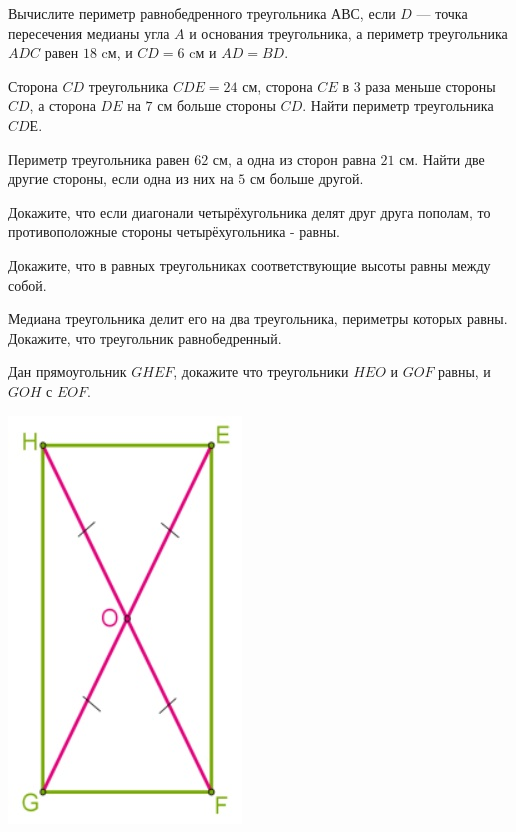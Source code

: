 \begin{class}[number=6]
	\begin{listofex}
		\item Вычислите периметр равнобедренного треугольника \(АВС\), если \(D\) --- точка пересечения медианы угла \(A\) и основания треугольника, а периметр треугольника \(ADC\) равен \(18\) cм, и \(CD = 6\) cм и \(AD = BD\).
		\item Сторона \(CD\) треугольника \(CDE = 24\) см, сторона \(CE\) в \(3\) раза меньше стороны  \(CD\), а сторона \(DE\) на \(7\) см больше стороны \(CD\). Найти периметр треугольника  \(CDЕ\).
		\item Периметр треугольника равен \(62\) см, а одна из сторон равна \(21\) см. Найти две другие стороны, если одна из них на \(5\) см больше другой.
		\item Докажите, что если диагонали четырёхугольника делят друг друга пополам, то противоположные стороны четырёхугольника - равны.
		\item Докажите, что в равных треугольниках соответствующие высоты равны между собой.
		\item Медиана треугольника делит его на два треугольника, периметры которых равны. Докажите, что треугольник равнобедренный.
		\item
		\begin{minipage}[t]{\bodywidth}
			Дан прямоугольник \(GHEF\), докажите что треугольники \(HEO\) и \(GOF\) равны, и \(GOH\) с \(EOF\).
		\end{minipage}
		\hspace{0.03\linewidth}
		\begin{minipage}[c]{\picwidth}
			\includegraphics[width=0.7\linewidth]{pics/G71M4C5-1.jpg}

\end{minipage}
\end{listofex}
\end{class}
